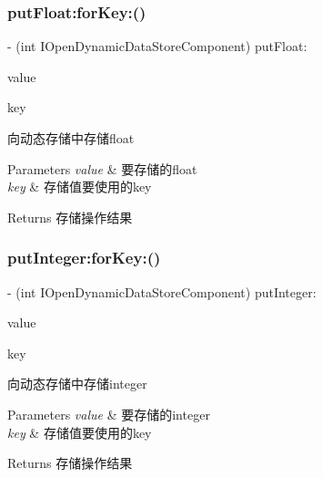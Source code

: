 \subsubsection{\texorpdfstring{put\+Float\+:for\+Key\+:()}{putFloat:forKey:()}}
{\footnotesize\ttfamily -\/ (int I\+Open\+Dynamic\+Data\+Store\+Component) put\+Float\+: \begin{DoxyParamCaption}\item[{(float)}]{value }\item[{forKey:(N\+S\+String $\ast$)}]{key }\end{DoxyParamCaption}}

向动态存储中存储float 
\begin{DoxyParams}{Parameters}
{\em value} & 要存储的float \\
\hline
{\em key} & 存储值要使用的key \\
\hline
\end{DoxyParams}
\begin{DoxyReturn}{Returns}
存储操作结果 
\end{DoxyReturn}
\mbox{\label{protocol_i_open_dynamic_data_store_component_01-p_ae5ef57168db6b83d3790e5606f08a752}} 
\subsubsection{\texorpdfstring{put\+Integer\+:for\+Key\+:()}{putInteger:forKey:()}}
{\footnotesize\ttfamily -\/ (int I\+Open\+Dynamic\+Data\+Store\+Component) put\+Integer\+: \begin{DoxyParamCaption}\item[{(N\+S\+Integer)}]{value }\item[{forKey:(N\+S\+String $\ast$)}]{key }\end{DoxyParamCaption}}

向动态存储中存储integer 
\begin{DoxyParams}{Parameters}
{\em value} & 要存储的integer \\
\hline
{\em key} & 存储值要使用的key \\
\hline
\end{DoxyParams}
\begin{DoxyReturn}{Returns}
存储操作结果 
\end{DoxyReturn}
\mbox{\label{protocol_i_open_dynamic_data_store_component_01-p_a5864ed9b1a5a2d32add19644427cfcc0}} 
